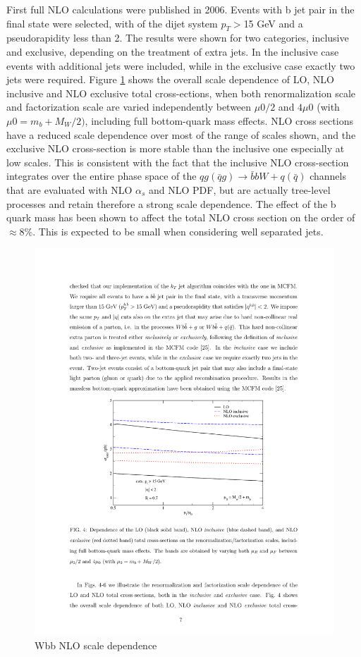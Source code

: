\par First full NLO calculations were published in 2006\cite{FebresCordero:2006sj}. 
Events with b jet pair in the final state were selected, with of the dijet system $p_T>$15 GeV  and a pseudorapidity less than 2. The results were shown for two categories, inclusive and exclusive, depending on the treatment of extra jets. In the inclusive case events with additional jets were included, while in the exclusive case exactly two jets were required.
Figure \ref{fig:2006_scale} shows the overall scale dependence of LO, NLO inclusive and NLO exclusive total cross-ections, when both renormalization scale and factorization scale are varied independently between $\mu 0/2$ and $4\mu 0$ (with $\mu 0 = m_b + M_W /2)$, including full bottom-quark mass effects. NLO cross sections have a reduced scale dependence over most of the range of scales shown, and the exclusive NLO cross-section is more stable than the inclusive one especially at low scales.
This is consistent with the fact that the inclusive NLO cross-section integrates over the
entire phase space of the $qg(\bar{q}g) \rightarrow \bar{b}bW + q(\bar{q})$ channels that are evaluated with NLO $\alpha_s$ and NLO PDF, but are actually tree-level processes and retain therefore a strong scale
dependence. The effect of the b quark mass has been shown to affect the total NLO cross section on the order of $\approx 8\%$. This is expected to be small when considering well separated jets.
\begin{figure}[htbp]
	\centering
		\includegraphics{Figures/2006_scale.pdf}
	\caption[Wbb NLO scale dependence]{Wbb NLO scale dependence\cite{FebresCordero:2006sj}}
	\label{fig:2006_scale}
\end{figure}
